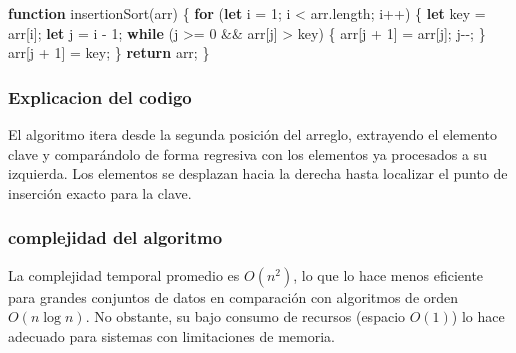\documentclass[
  spanish,
  letterpaper,
  DIV=11,
  numbers=noendperiod]{scrreprt}
\newenvironment{Shaded}{\begin{snugshade}}{\end{snugshade}}
\newcommand{\AttributeTok}[1]{\textcolor[rgb]{0.40,0.45,0.13}{#1}}
\newcommand{\ControlFlowTok}[1]{\textcolor[rgb]{0.00,0.23,0.31}{\textbf{#1}}}
\newcommand{\DecValTok}[1]{\textcolor[rgb]{0.68,0.00,0.00}{#1}}
\newcommand{\FunctionTok}[1]{\textcolor[rgb]{0.28,0.35,0.67}{#1}}
\newcommand{\KeywordTok}[1]{\textcolor[rgb]{0.00,0.23,0.31}{\textbf{#1}}}
\newcommand{\NormalTok}[1]{\textcolor[rgb]{0.00,0.23,0.31}{#1}}
\newcommand{\OperatorTok}[1]{\textcolor[rgb]{0.37,0.37,0.37}{#1}}
\begin{document}
\begin{Shaded}
\begin{Highlighting}[]
\KeywordTok{function} \FunctionTok{insertionSort}\NormalTok{(arr) \{}
  \ControlFlowTok{for}\NormalTok{ (}\KeywordTok{let}\NormalTok{ i }\OperatorTok{=} \DecValTok{1}\OperatorTok{;}\NormalTok{ i }\OperatorTok{\textless{}}\NormalTok{ arr}\OperatorTok{.}\AttributeTok{length}\OperatorTok{;}\NormalTok{ i}\OperatorTok{++}\NormalTok{) \{}
    \KeywordTok{let}\NormalTok{ key }\OperatorTok{=}\NormalTok{ arr[i]}\OperatorTok{;}
    \KeywordTok{let}\NormalTok{ j }\OperatorTok{=}\NormalTok{ i }\OperatorTok{{-}} \DecValTok{1}\OperatorTok{;}
    \ControlFlowTok{while}\NormalTok{ (j }\OperatorTok{\textgreater{}=} \DecValTok{0} \OperatorTok{\&\&}\NormalTok{ arr[j] }\OperatorTok{\textgreater{}}\NormalTok{ key) \{}
\NormalTok{      arr[j }\OperatorTok{+} \DecValTok{1}\NormalTok{] }\OperatorTok{=}\NormalTok{ arr[j]}\OperatorTok{;}
\NormalTok{      j}\OperatorTok{{-}{-};}
\NormalTok{    \}}
\NormalTok{    arr[j }\OperatorTok{+} \DecValTok{1}\NormalTok{] }\OperatorTok{=}\NormalTok{ key}\OperatorTok{;}
\NormalTok{  \}}
  \ControlFlowTok{return}\NormalTok{ arr}\OperatorTok{;}
\NormalTok{\}}
\end{Highlighting}
\end{Shaded}

\subsubsection{\texorpdfstring{\textbf{Explicacion del
codigo}}{Explicacion del codigo}}\label{explicacion-del-codigo-2}

El algoritmo itera desde la segunda posición del arreglo, extrayendo el
elemento clave y comparándolo de forma regresiva con los elementos ya
procesados a su izquierda. Los elementos se desplazan hacia la derecha
hasta localizar el punto de inserción exacto para la clave.

\subsubsection{\texorpdfstring{\textbf{complejidad del
algoritmo}}{complejidad del algoritmo}}\label{complejidad-del-algoritmo-2}

La complejidad temporal promedio es \textbf{\(O(n^2)\)}, lo que lo hace
menos eficiente para grandes conjuntos de datos en comparación con
algoritmos de orden \(O(n \log n)\). No obstante, su bajo consumo de
recursos (espacio \textbf{\(O(1)\)}) lo hace adecuado para sistemas con
limitaciones de memoria.
\end{document}
